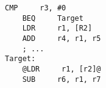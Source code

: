 \begin{lstlisting}[style=AsmStyle]    
    CMP     r3, #0
    BEQ     Target
    LDR     r1, [R2]
    ADD     r4, r1, r5
    ; ...
Target:
    @LDR     r1, [r2]@
    SUB     r6, r1, r7
\end{lstlisting}